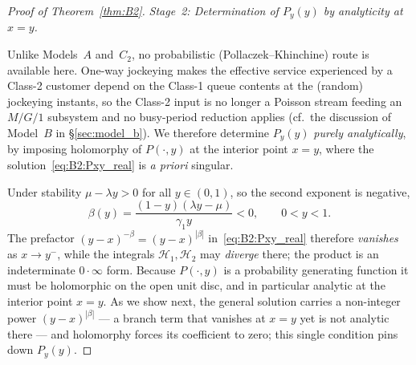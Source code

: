 \begin{proof}[Proof of Theorem~\ref{thm:B2}]
\medskip\noindent\textit{Stage~2: Determination of $P_y(y)$ by analyticity at $x=y$.}
\medskip

Unlike Models~$A$ and~$C_2$, no probabilistic (Pollaczek--Khinchine) route is available
here. One-way jockeying makes the effective service experienced by a Class-2 customer
depend on the Class-1 queue contents at the (random) jockeying instants, so the Class-2
input is no longer a Poisson stream feeding an $M/G/1$ subsystem and no busy-period
reduction applies (cf.\ the discussion of Model~$B$ in \S\ref{sec:model_b}). We therefore
determine $P_y(y)$ \emph{purely analytically}, by imposing holomorphy of $P(\cdot,y)$ at
the interior point $x=y$, where the solution~\eqref{eq:B2:Pxy_real} is \emph{a priori}
singular.

Under stability $\mu-\lambda y>0$ for all $y\in(0,1)$, so the second exponent is negative,
\begin{equation}
    \beta(y) = \frac{(1-y)(\lambda y-\mu)}{\gamma_1 y} < 0,
    \qquad 0<y<1.
    \label{eq:B2:beta_negative}
\end{equation}
The prefactor $(y-x)^{-\beta}=(y-x)^{|\beta|}$ in~\eqref{eq:B2:Pxy_real} therefore
\emph{vanishes} as $x\to y^{-}$, while the integrals $\mathcal{H}_1,\mathcal{H}_2$ may
\emph{diverge} there; the product is an indeterminate $0\cdot\infty$ form. Because
$P(\cdot,y)$ is a probability generating function it must be holomorphic on the open unit
disc, and in particular analytic at the interior point $x=y$. As we show next, the general
solution carries a non-integer power $(y-x)^{|\beta|}$ --- a branch term that vanishes at
$x=y$ yet is not analytic there --- and holomorphy forces its coefficient to zero; this
single condition pins down $P_y(y)$.


\end{proof}

